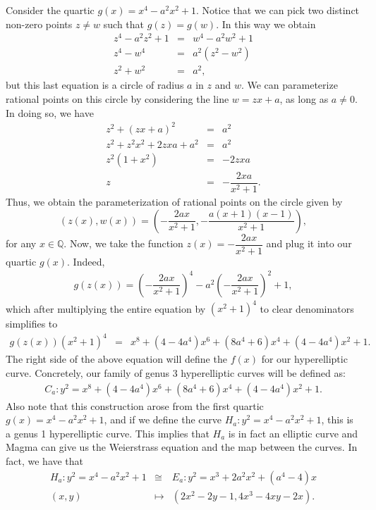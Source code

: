 \documentclass{article}
\newcommand{\Q}{\mathbb{Q}}
\theoremstyle{definition}
\begin{document}
\noindent Consider the quartic $g(x) = x^4 - a^2 x^2 + 1$. Notice that we can pick two distinct non-zero points $z \neq w$ such that $g(z) = g(w)$. In this way we obtain
\begin{eqnarray*}
    z^4 - a^2 z^2 + 1 &=& w^4 - a^2 w^2 + 1 \\
    z^4 - w^4 &=& a^2(z^2 - w^2) \\
    z^2 + w^2 &=& a^2,
\end{eqnarray*}
but this last equation is a circle of radius $a$ in $z$ and $w$. We can parameterize rational points on this circle by considering the line $w = zx + a$, as long as $a \neq 0$. In doing so, we have
\begin{eqnarray*}
    z^2 + (zx + a)^2 &=& a^2 \\
    z^2 + z^2x^2 + 2zxa + a^2 &=& a^2 \\
    z^2(1+x^2) &=& -2zxa \\
    z &=& -\dfrac{2xa}{x^2 + 1}.
\end{eqnarray*}
Thus, we obtain the parameterization of rational points on the circle given by 
$$\left(z(x), w(x) \right) = \left(-\dfrac{2ax}{x^2 + 1}, -\dfrac{a(x+1)(x-1)}{x^2 + 1} \right),$$ 
for any $x \in \Q$. Now, we take the function $z(x) = -\dfrac{2ax}{x^2 + 1}$ and plug it into our quartic $g(x)$. Indeed,
\begin{eqnarray*}
    g(z(x)) = \left(-\dfrac{2ax}{x^2 + 1} \right)^4 - a^2 \left(-\dfrac{2ax}{x^2 + 1} \right)^2 + 1,
\end{eqnarray*}
which after multiplying the entire equation by $(x^2 + 1)^4$ to clear denominators simplifies to 
\begin{eqnarray*}
    g(z(x))(x^2 + 1)^4 &=& x^8 + (4-4a^4)x^6 + (8a^4 + 6)x^4 + (4-4a^4)x^2 + 1.
\end{eqnarray*}
The right side of the above equation will define the $f(x)$ for our hyperelliptic curve. Concretely, our family of genus 3 hyperelliptic curves will be defined as:
\begin{eqnarray*}
    C_a \colon y^2 = x^8 + (4-4a^4)x^6 + (8a^4 + 6)x^4 + (4-4a^4)x^2 + 1.
\end{eqnarray*}
Also note that this construction arose from the first quartic $g(x) = x^4 - a^2x^2 + 1$, and if we define the curve $H_a: y^2 = x^4 - a^2x^2 + 1$, this is a genus 1 hyperelliptic curve. This implies that $H_a$ is in fact an elliptic curve and Magma can give us the Weierstrass equation and the map between the curves. In fact, we have that 
\begin{eqnarray*}
    H_a \colon y^2 = x^4 - a^2x^2 + 1 &\cong& E_a \colon y^2 = x^3 + 2a^2x^2 + (a^4-4)x \\
    (x,y) &\mapsto& (2x^2 - 2y - 1, 4x^3 - 4xy - 2x).
\end{eqnarray*}
\end{document}
